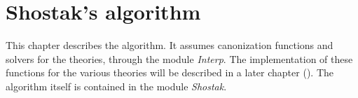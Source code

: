 
\newpage
\section*{Shostak's algorithm}

\ocwsection\label{algo}
This chapter describes the algorithm. It assumes canonization
functions and solvers for the theories, through the module
\textit{Interp}. The implementation of these functions for the various
theories will be described in a later chapter ().
The algorithm itself is contained in the module \textit{Shostak}.


